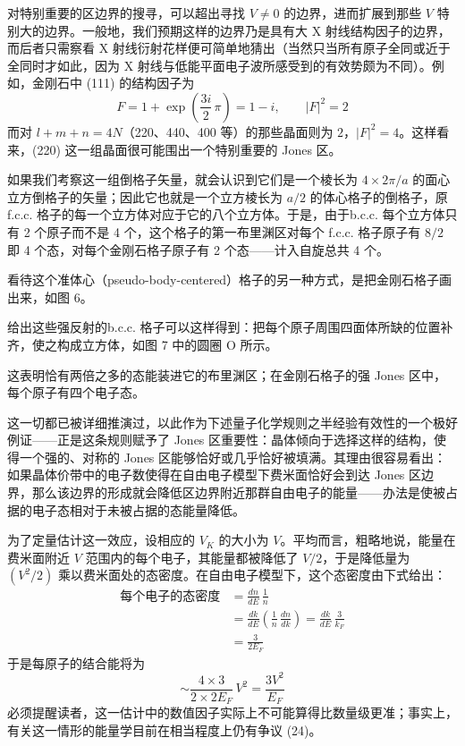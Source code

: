 对特别重要的区边界的搜寻，可以超出寻找 $V\ne 0$ 的边界，进而扩展到那些 $V$ 特别大的边界。一般地，我们预期这样的边界乃是具有大 X 射线结构因子的边界，而后者只需察看 X 射线衍射花样便可简单地猜出（当然只当所有原子全同或近于全同时才如此，因为 X 射线与低能平面电子波所感受到的有效势颇为不同）。例如，金刚石中 (111) 的结构因子为
\begin{equation*}
F = 1 + \exp\left(\frac{3i}{2}\,\pi\right) = 1 - i,\qquad |F|^2 = 2
\end{equation*}
而对 $l+m+n=4N$（220、440、400 等）的那些晶面则为 $2$，$|F|^2=4$。这样看来，(220) 这一组晶面很可能围出一个特别重要的 Jones 区。

如果我们考察这一组倒格子矢量，就会认识到它们是一个棱长为 $4\times 2\pi/a$ 的面心立方倒格子的矢量；因此它也就是一个立方棱长为 $a/2$ 的体心格子的倒格子，原 f.c.c. 格子的每一个立方体对应于它的八个立方体。于是，由于b.c.c. 每个立方体只有 2 个原子而不是 4 个，这个格子的第一布里渊区对每个 f.c.c. 格子原子有 $8/2$ 即 4 个态，对每个金刚石格子原子有 2 个态——计入自旋总共 4 个。

看待这个准体心（pseudo-body-centered）格子的另一种方式，是把金刚石格子画出来，如图 6。


给出这些强反射的b.c.c. 格子可以这样得到：把每个原子周围四面体所缺的位置补齐，使之构成立方体，如图 7 中的圆圈 O 所示。


这表明恰有两倍之多的态能装进它的布里渊区；在金刚石格子的强 Jones 区中，每个原子有四个电子态。

这一切都已被详细推演过，以此作为下述量子化学规则之半经验有效性的一个极好例证——正是这条规则赋予了 Jones 区重要性：晶体倾向于选择这样的结构，使得一个强的、对称的 Jones 区能够恰好或几乎恰好被填满。其理由很容易看出：如果晶体价带中的电子数使得在自由电子模型下费米面恰好会到达 Jones 区边界，那么该边界的形成就会降低区边界附近那群自由电子的能量——办法是使被占据的电子态相对于未被占据的态能量降低。

为了定量估计这一效应，设相应的 $V_K$ 的大小为 $V$。平均而言，粗略地说，能量在费米面附近 $V$ 范围内的每个电子，其能量都被降低了 $V/2$，于是降低量为 $(V^2/2)$ 乘以费米面处的态密度。在自由电子模型下，这个态密度由下式给出：
\begin{align*}
\text{每个电子的态密度} &= \frac{dn}{dE}\,\frac{1}{n} \\
&= \frac{dk}{dE}\left(\frac{1}{n}\,\frac{dn}{dk}\right) = \frac{dk}{dE}\,\frac{3}{k_F} \\
&= \frac{3}{2E_F}
\end{align*}
于是每原子的结合能将为
\begin{equation*}
\sim \frac{4\times 3}{2\times 2E_F}\,V^2 = \frac{3V^2}{E_F}
\end{equation*}
必须提醒读者，这一估计中的数值因子实际上不可能算得比数量级更准；事实上，有关这一情形的能量学目前在相当程度上仍有争议 (24)。

